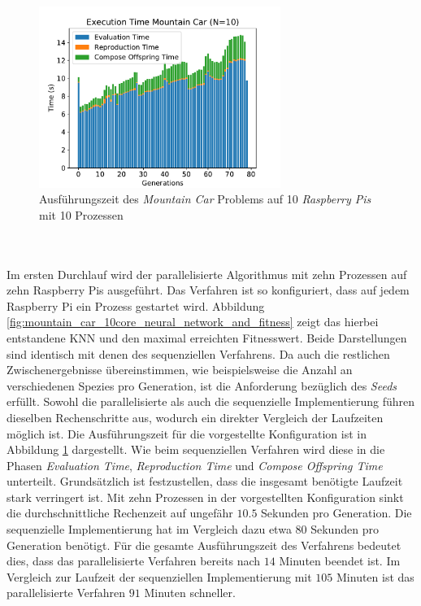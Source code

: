 \begin{figure}[!h]
	\centering
	\includegraphics[width=0.7\textwidth]{./img/mountain_car_analysis/1413_time_10cores_10pis.pdf} 
	\caption{Ausführungszeit des \emph{Mountain Car} Problems auf 10 \emph{Raspberry Pis} mit 10 Prozessen}
	\label{fig:mountain_car_time_10cores_10pi}
\end{figure}
\\\\
Im ersten Durchlauf wird der parallelisierte Algorithmus mit zehn Prozessen auf zehn Raspberry Pis ausgeführt. Das Verfahren ist so konfiguriert, dass auf jedem Raspberry Pi ein Prozess gestartet wird. Abbildung \ref{fig:mountain_car_10core_neural_network_and_fitness} zeigt das hierbei entstandene \ac{KNN} und den maximal erreichten Fitnesswert. Beide Darstellungen sind identisch mit denen des sequenziellen Verfahrens. Da auch die restlichen Zwischenergebnisse übereinstimmen, wie beispielsweise die Anzahl an verschiedenen Spezies pro Generation, ist die Anforderung bezüglich des \emph{Seeds} erfüllt. Sowohl die parallelisierte als auch die sequenzielle Implementierung führen dieselben Rechenschritte aus, wodurch ein direkter Vergleich der Laufzeiten möglich ist. Die Ausführungszeit für die vorgestellte Konfiguration ist in Abbildung  \ref{fig:mountain_car_time_10cores_10pi} dargestellt. Wie beim sequenziellen Verfahren wird diese in die Phasen \emph{Evaluation Time}, \emph{Reproduction Time} und \emph{Compose Offspring Time} unterteilt. Grundsätzlich ist festzustellen, dass die insgesamt benötigte Laufzeit stark verringert ist. Mit zehn Prozessen in der vorgestellten Konfiguration sinkt die durchschnittliche Rechenzeit auf ungefähr $10.5$ Sekunden pro Generation. Die sequenzielle Implementierung hat im Vergleich dazu etwa $80$ Sekunden pro Generation benötigt. Für die gesamte Ausführungszeit des Verfahrens bedeutet dies, dass das parallelisierte Verfahren bereits nach $14$ Minuten beendet ist. Im Vergleich zur Laufzeit der sequenziellen Implementierung mit $105$ Minuten ist das parallelisierte Verfahren $91$ Minuten schneller.
